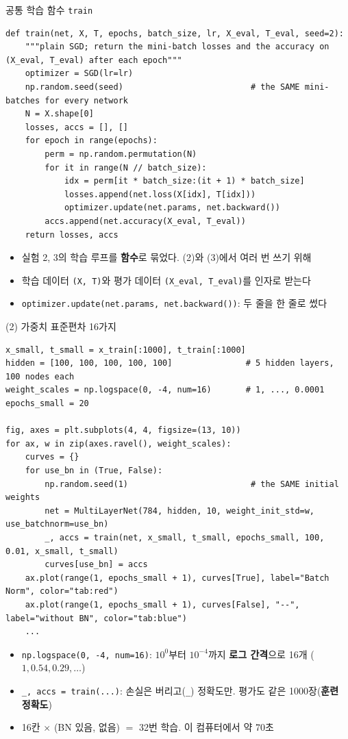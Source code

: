 \documentclass[aspectratio=169,11pt]{beamer}
\newcommand{\codesmall}{\ttfamily\fontsize{7.4}{8.3}\selectfont}
\newcommand{\code}[1]{\texttt{#1}}
\begin{document}
\begin{frame}[fragile]{공통 학습 함수 \code{train}}
\begin{lstlisting}
def train(net, X, T, epochs, batch_size, lr, X_eval, T_eval, seed=2):
    """plain SGD; return the mini-batch losses and the accuracy on (X_eval, T_eval) after each epoch"""
    optimizer = SGD(lr=lr)
    np.random.seed(seed)                          # the SAME mini-batches for every network
    N = X.shape[0]
    losses, accs = [], []
    for epoch in range(epochs):
        perm = np.random.permutation(N)
        for it in range(N // batch_size):
            idx = perm[it * batch_size:(it + 1) * batch_size]
            losses.append(net.loss(X[idx], T[idx]))
            optimizer.update(net.params, net.backward())
        accs.append(net.accuracy(X_eval, T_eval))
    return losses, accs
\end{lstlisting}
\small
\begin{itemize}
\item 실험 2, 3의 학습 루프를 \textbf{함수}로 묶었다. (2)와 (3)에서 여러 번 쓰기 위해
\item 학습 데이터 \code{(X, T)}와 평가 데이터 \code{(X\_eval, T\_eval)}를 인자로 받는다
\item \code{optimizer.update(net.params, net.backward())}: 두 줄을 한 줄로 썼다
\end{itemize}
\end{frame}

\begin{frame}[fragile]{(2) 가중치 표준편차 16가지}
\begin{lstlisting}[basicstyle=\codesmall]
x_small, t_small = x_train[:1000], t_train[:1000]
hidden = [100, 100, 100, 100, 100]               # 5 hidden layers, 100 nodes each
weight_scales = np.logspace(0, -4, num=16)       # 1, ..., 0.0001
epochs_small = 20

fig, axes = plt.subplots(4, 4, figsize=(13, 10))
for ax, w in zip(axes.ravel(), weight_scales):
    curves = {}
    for use_bn in (True, False):
        np.random.seed(1)                         # the SAME initial weights
        net = MultiLayerNet(784, hidden, 10, weight_init_std=w, use_batchnorm=use_bn)
        _, accs = train(net, x_small, t_small, epochs_small, 100, 0.01, x_small, t_small)
        curves[use_bn] = accs
    ax.plot(range(1, epochs_small + 1), curves[True], label="Batch Norm", color="tab:red")
    ax.plot(range(1, epochs_small + 1), curves[False], "--", label="without BN", color="tab:blue")
    ...
\end{lstlisting}
\small
\begin{itemize}
\item \code{np.logspace(0, -4, num=16)}: $10^0$부터 $10^{-4}$까지 \textbf{로그 간격}으로 16개 ($1, 0.54, 0.29, \ldots$)
\item \code{\_, accs = train(...)}: 손실은 버리고(\code{\_}) 정확도만. 평가도 같은 1000장(\textbf{훈련 정확도})
\item 16칸 $\times$ (BN 있음, 없음) $=$ 32번 학습. 이 컴퓨터에서 약 70초
\end{itemize}
\end{frame}
\end{document}
